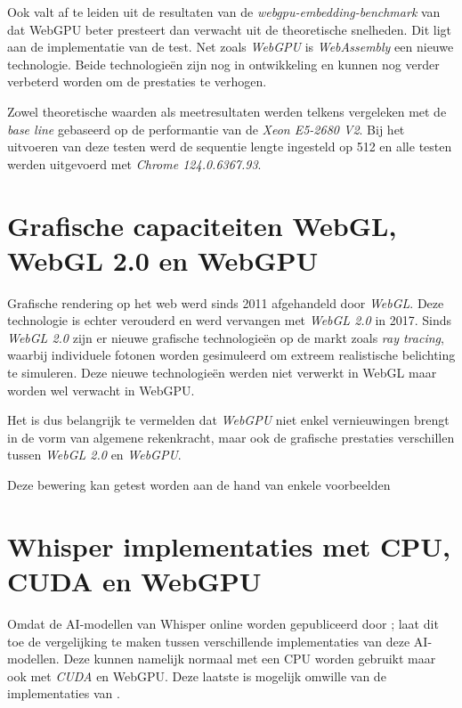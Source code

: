 \bigbreak{}

Ook valt af te leiden uit de resultaten van de \textit{webgpu-embedding-benchmark} van \textcite{Lochner2024} dat WebGPU beter presteert dan verwacht uit de theoretische snelheden. Dit ligt aan de implementatie van de test. Net zoals \textit{WebGPU} is \textit{WebAssembly} een nieuwe technologie. Beide technologieën zijn nog in ontwikkeling en kunnen nog verder verbeterd worden om de prestaties te verhogen. 

\bigbreak{}

Zowel theoretische waarden als meetresultaten werden telkens vergeleken met de \textit{base line} gebaseerd op de performantie van de \textit{Xeon E5-2680 V2}. Bij het uitvoeren van deze testen werd de sequentie lengte ingesteld op 512 en alle testen werden uitgevoerd met \emph{Chrome 124.0.6367.93}.

\break{}

\section{Grafische capaciteiten WebGL, WebGL 2.0 en WebGPU}

Grafische rendering op het web werd sinds 2011 afgehandeld door \textit{WebGL}. Deze technologie is echter verouderd en werd vervangen met \textit{WebGL 2.0} in 2017. Sinds \textit{WebGL 2.0} zijn er nieuwe grafische technologieën op de markt zoals \textit{ray tracing}, waarbij individuele fotonen worden gesimuleerd om extreem realistische belichting te simuleren. Deze nieuwe technologieën werden niet verwerkt in WebGL maar worden wel verwacht in WebGPU.

\bigbreak{}

Het is dus belangrijk te vermelden dat \textit{WebGPU} niet enkel vernieuwingen brengt in de vorm van algemene rekenkracht, maar ook de grafische prestaties verschillen tussen \textit{WebGL 2.0} en \textit{WebGPU}. 

\bigbreak{}

Deze bewering kan getest worden aan de hand van enkele voorbeelden

\break{}

\section{Whisper implementaties met CPU, CUDA en WebGPU}

Omdat de AI-modellen van Whisper online worden gepubliceerd door \textcite{OpenAI2023}; laat dit toe de vergelijking te maken tussen verschillende implementaties van deze AI-modellen. Deze kunnen namelijk normaal met een CPU worden gebruikt maar ook met \textit{CUDA} en WebGPU. Deze laatste is mogelijk omwille van de implementaties van \textcite{Fleetwood2024, Fleetwood2023b}.


